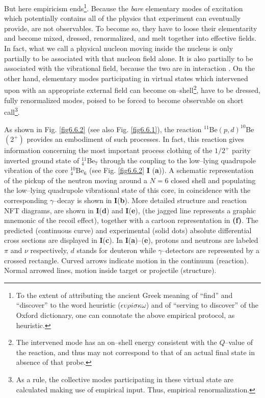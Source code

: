 But here empiricism ends\footnote{To the extent of attributing the ancient Greek meaning of ``find'' and ``discover'' to the word heuristic ($\epsilon\upsilon\rho i \sigma\kappa\omega$) and of ``serving to discover'' of the Oxford dictionary, one can connotate the above empirical protocol, as heuristic.}. Because the \textit{bare} elementary modes of excitation which potentially contains all of the physics that experiment can eventually provide, are not observables. To become so, they have to loose their elementarity and become mixed, dressed, renormalized, and melt together into effective fields. In fact, what we call a physical nucleon moving inside the nucleus is only partially to be associated with that nucleon field alone. It is also partially to be associated with the vibrational field, because the two are in interaction . On the other hand, elementary modes participating in virtual states which intervened upon with an appropriate external field can become on--shell\footnote{The intervened mode has an on--shell energy consistent with the $Q$--value of the reaction, and thus may not correspond to that of an actual final state in absence of that probe.\label{footnote2}}, have to be dressed, fully renormalized modes, poised to be forced to become observable on short call\footnote{As a rule, the collective modes participating in these virtual state are calculated making use of empirical input. Thus, empirical renormalization.}.


As shown in Fig. \ref{fig6.6.2} (see also Fig. \ref{fig6.6.1}), the reaction $^{11}$Be$(p,d)^{10}$Be$(2^+)$ provides an embodiment of such processes.  	 In fact, this reaction gives information concerning the most important process   clothing  of the $1/2^+$ parity inverted ground state of $^{11}_4$Be$_{7}$
  	through the coupling to the low--lying quadrupole vibration of the core $^{10}_4$Be$_6$ (see Fig. \ref{fig6.6.2} \textbf{I} (\textbf{a})). A schematic representation 
  	of the pickup of the neutron moving around a $N=6$ closed shell and populating the low--lying
  	quadrupole vibrational state of this core, in coincidence with the corresponding $\gamma$--decay is shown in \textbf{I}(\textbf{b}).  More  detailed structure and reaction NFT diagrams,  
  are	shown in  \textbf{I}(\textbf{d}) and \textbf{I}(\textbf{e}), (the jagged line represents 
  	  	a graphic mnemonic of the recoil effect),  together with a cartoon representation in {\bf (f)}. The predicted (continuous curve) and experimental
  	  	  	(solid dots) absolute differential cross sections   are displayed in \textbf{I}(\textbf{c}).
  In \textbf{I}(\textbf{a})--(\textbf{e}),	protons 
  	and neutrons are labeled $\pi$ and $\nu$ respectively,  $d$ stands for deuteron while $\gamma$--detectors are represented by a crossed rectangle.
  	Curved arrows indicate  motion in the continuum (reaction). Normal arrowed 
  	lines, motion inside target or projectile (structure).  
  	
